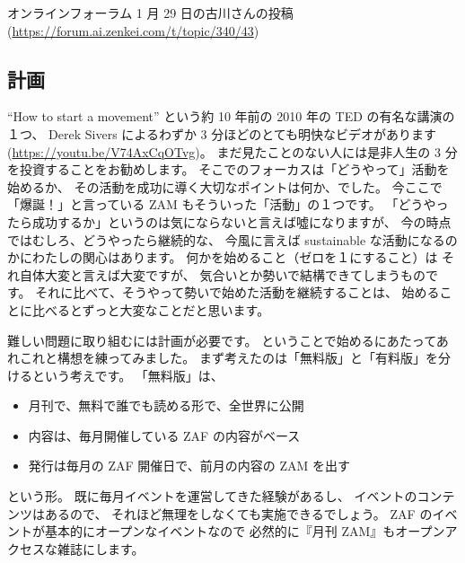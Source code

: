 \documentclass[dvipdfmx,autodetect-engine,10pt,b5paper,papersize,openany,dvipsnames]{jsbook}
\begin{document}
\vspace{3.1cm}

\begin{center}
オンラインフォーラム 1 月 29 日の古川さんの投稿\\
(\url{https://forum.ai.zenkei.com/t/topic/340/43})
\end{center}

\begin{multicols}{2}

\section{計画}
``How to start a movement''
という約 10 年前の 2010 年の TED の有名な講演の１つ、
Derek Sivers によるわずか 3 分ほどのとても明快なビデオがあります
(\url{https://youtu.be/V74AxCqOTvg})。
まだ見たことのない人には是非人生の 3 分を投資することをお勧めします。
そこでのフォーカスは「どうやって」活動を始めるか、
その活動を成功に導く大切なポイントは何か、でした。
今ここで「爆誕！」と言っている ZAM もそういった「活動」の１つです。
「どうやったら成功するか」というのは気にならないと言えば噓になりますが、
今の時点ではむしろ、どうやったら継続的な、
今風に言えば sustainable な活動になるのかにわたしの関心はあります。
何かを始めること（ゼロを１にすること）は
それ自体大変と言えば大変ですが、
気合いとか勢いで結構できてしまうものです。
それに比べて、そうやって勢いで始めた活動を継続することは、
始めることに比べるとずっと大変なことだと思います。

難しい問題に取り組むには計画が必要です。
ということで始めるにあたってあれこれと構想を練ってみました。
まず考えたのは「無料版」と「有料版」を分けるという考えです。
「無料版」は、
\begin{itemize}
\item 月刊で、無料で誰でも読める形で、全世界に公開
\item 内容は、毎月開催している ZAF の内容がベース
\item 発行は毎月の ZAF 開催日で、前月の内容の ZAM を出す
\end{itemize}
という形。
既に毎月イベントを運営してきた経験があるし、
イベントのコンテンツはあるので、
それほど無理をしなくても実施できるでしょう。
ZAF のイベントが基本的にオープンなイベントなので
必然的に『月刊 ZAM』もオープンアクセスな雑誌にします。


\end{multicols}
\end{document}
